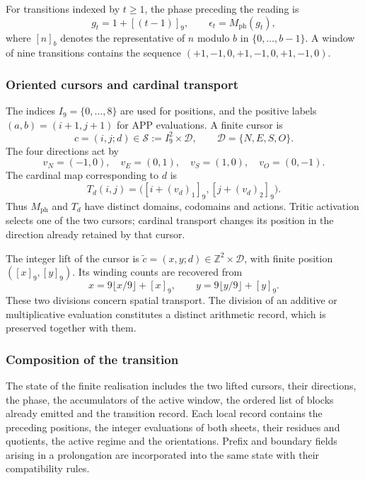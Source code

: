 For transitions indexed by \(t\geq1\), the phase preceding the reading is
\begin{equation}
 g_t=1+[(t-1)]_9,\qquad \epsilon_t=M_{\mathrm{ph}}(g_t),
 \label{act21:tpk:fase}
\end{equation}
where \([n]_b\) denotes the representative of \(n\) modulo \(b\) in
\(\{0,\ldots,b-1\}\). A window of nine transitions contains the sequence
\((+1,-1,0,+1,-1,0,+1,-1,0)\).

\subsubsection{Oriented cursors and cardinal transport}

The indices \(I_9=\{0,\ldots,8\}\) are used for positions, and the positive
labels \((a,b)=(i+1,j+1)\) for APP evaluations. A finite cursor is
\[
 c=(i,j;d)\in\mathcal S:=I_9^2\times\mathcal D,
 \qquad \mathcal D=\{N,E,S,O\}.
\]
The four directions act by
\[
 v_N=(-1,0),\quad v_E=(0,1),\quad
 v_S=(1,0),\quad v_O=(0,-1).
\]
The cardinal map corresponding to \(d\) is
\[
 T_d(i,j)=\bigl([i+(v_d)_1]_9,[j+(v_d)_2]_9\bigr).
\]
Thus \(M_{\mathrm{ph}}\) and \(T_d\) have distinct domains, codomains
and actions. Tritic activation selects one of the two cursors; cardinal
transport changes its position in the direction already retained by that
cursor.

The integer lift of the cursor is
\(\widetilde c=(x,y;d)\in\mathbb Z^2\times\mathcal D\), with finite position
\(([x]_9,[y]_9)\). Its winding counts are recovered from
\begin{equation}
 x=9\lfloor x/9\rfloor+[x]_9,\qquad
 y=9\lfloor y/9\rfloor+[y]_9.
 \label{act21:tpk:vueltas}
\end{equation}
These two divisions concern spatial transport. The division of an additive
or multiplicative evaluation constitutes a distinct arithmetic record,
which is preserved together with them.

\subsubsection{Composition of the transition}

The state of the finite realisation includes the two lifted cursors, their
directions, the phase, the accumulators of the active window, the ordered
list of blocks already emitted and the transition record. Each local
record contains the preceding positions, the integer evaluations of both
sheets, their residues and quotients, the active regime and the
orientations. Prefix and boundary fields arising in a prolongation are
incorporated into the same state with their compatibility rules.

